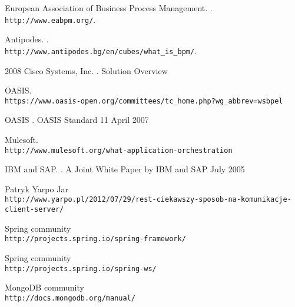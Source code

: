 \documentclass[11pt]{aghdpl}
\author{Tomasz Landowski}
\date{2014}
\begin{document}
\titlepages
\setcounter{tocdepth}{3}
\tableofcontents
\clearpage








\begin{thebibliography}{1}

%
%

European Association of Business Process Management.
.
\newblock \\\texttt{http://www.eabpm.org/}.


Antipodes.
.
\newblock \\\texttt{http://www.antipodes.bg/en/cubes/what\_is\_bpm/}.

2008 Cisco Systems, Inc.
.
\newblock Solution Overview 


OASIS.
\newblock \\\texttt{https://www.oasis-open.org/committees/tc\_home.php?wg\_abbrev=wsbpel}

OASIS
.
\newblock OASIS Standard 11 April 2007 

Mulesoft.
\newblock \\\texttt{http://www.mulesoft.org/what-application-orchestration}

IBM and SAP.
.
\newblock A Joint White Paper by IBM and SAP July 2005 

Patryk Yarpo Jar
\newblock \\\texttt{http://www.yarpo.pl/2012/07/29/rest-ciekawszy-sposob-na-komunikacje-client-server/}

Spring community
\newblock \\\texttt{http://projects.spring.io/spring-framework/}

Spring community
\newblock \\\texttt{http://projects.spring.io/spring-ws/}

MongoDB community
\newblock \\\texttt{http://docs.mongodb.org/manual/}


\end{thebibliography}
\end{document}

